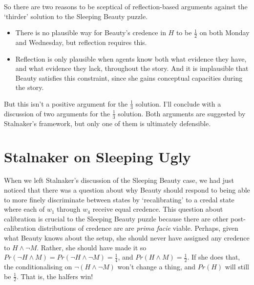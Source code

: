 So there are two reasons to be sceptical of reflection-based arguments against the `thirder' solution to the Sleeping Beauty puzzle.

\begin{itemize}
\item There is no plausible way for Beauty's credence in \(H\) to be \(\frac{1}{2}\) on both Monday and Wednesday, but reflection requires this.
\item Reflection is only plausible when agents know both what evidence they have, and what evidence they lack, throughout the story. And it is implausible that Beauty satisfies this constraint, since she gains conceptual capacities during the story.
\end{itemize}

\noindent But this isn't a positive argument for the \(\frac{1}{3}\) solution. I'll conclude with a discussion of two arguments for the \(\frac{1}{3}\) solution. Both arguments are suggested by Stalnaker's framework, but only one of them is ultimately defensible.

\section{Stalnaker on Sleeping Ugly}
When we left Stalnaker's discussion of the Sleeping Beauty case, we had just noticed that there was a question about why Beauty should respond to being able to more finely discriminate between states by `recalibrating' to a credal state where each of \(w_1\) through \(w_4\) receive equal credence. This question about calibration is crucial to the Sleeping Beauty puzzle because there are other post-calibration distributions of credence are are \textit{prima facie} viable. Perhaps, given what Beauty knows about the setup, she should never have assigned any credence to \(H \wedge \neg M\). Rather, she should have made it so \(Pr(\neg H \wedge M) = Pr(\neg H \wedge \neg M) = \frac{1}{4}\), and \(Pr(H \wedge M) = \frac{1}{2}\). If she does that, the conditionalising on \(\neg(H \wedge \neg M)\) won't change a thing, and \(Pr(H)\) will still be \(\frac{1}{2}\). That is, the halfers win!

